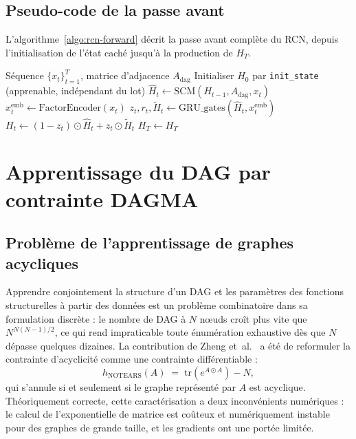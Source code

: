 \documentclass[14pt,a4paper,openany]{extreport}
\theoremstyle{definition}
\newcommand{\Adag}{\ensuremath{A_{\mathrm{dag}}}}
\newcommand{\HT}{\ensuremath{H_T}}
\begin{document}
\subsection{Pseudo-code de la passe avant}
\label{ssec:oracle-rcn-pseudocode}

L'algorithme~\ref{algo:rcn-forward} décrit la passe avant complète du RCN, depuis l'initialisation de l'état caché jusqu'à la production de $\HT$.

\begin{algorithm}[ht]
\caption{Passe avant du RCN}
\label{algo:rcn-forward}
\begin{algorithmic}[1]
\Require Séquence $\{x_t\}_{t=1}^{T}$, matrice d'adjacence $\Adag$
\State Initialiser $H_0$ par \texttt{init\_state} (apprenable, indépendant du lot)
  \State $\hat{H}_t \gets \mathrm{SCM}(H_{t-1}, \Adag, x_t)$ 
  \State $x_t^{\mathrm{emb}} \gets \mathrm{FactorEncoder}(x_t)$
  \State $z_t, r_t, \tilde{H}_t \gets \mathrm{GRU\_gates}(\hat{H}_t, x_t^{\mathrm{emb}})$ 
  \State $H_t \gets (1 - z_t) \odot \hat{H}_t + z_t \odot \tilde{H}_t$
\EndFor
\State \Return $\HT \gets H_T$
\end{algorithmic}
\end{algorithm}

\section{Apprentissage du DAG par contrainte DAGMA}
\label{sec:oracle-dagma}

\subsection{Problème de l'apprentissage de graphes acycliques}
\label{ssec:oracle-dag-problem}

Apprendre conjointement la structure d'un DAG et les paramètres des fonctions structurelles à partir des données est un problème combinatoire dans sa formulation discrète : le nombre de DAG à $N$ nœuds croît plus vite que $N^{N(N-1)/2}$, ce qui rend impraticable toute énumération exhaustive dès que $N$ dépasse quelques dizaines. La contribution de Zheng et~al.~\cite{zheng_notears_2018} a été de reformuler la contrainte d'acyclicité comme une contrainte différentiable :
\begin{equation}
  h_{\mathrm{NOTEARS}}(A) \;=\; \mathrm{tr}\!\left( e^{A \odot A} \right) - N,
  \label{eq:notears}
\end{equation}
qui s'annule si et seulement si le graphe représenté par $A$ est acyclique. Théoriquement correcte, cette caractérisation a deux inconvénients numériques : le calcul de l'exponentielle de matrice est coûteux et numériquement instable pour des graphes de grande taille, et les gradients ont une portée limitée.
\end{document}
